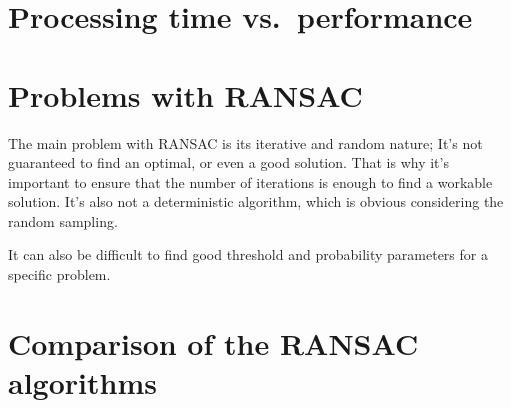 \section{Processing time vs.\ performance}


\section{Problems with RANSAC}

The main problem with RANSAC is its iterative and random nature; It's not
guaranteed to find an optimal, or even a good solution. That is why it's
important to ensure that the number of iterations is enough to find a workable
solution. It's also not a deterministic algorithm, which is obvious considering
the random sampling.

It can also be difficult to find good threshold and probability parameters for
a specific problem.

\section{Comparison of the RANSAC algorithms}
